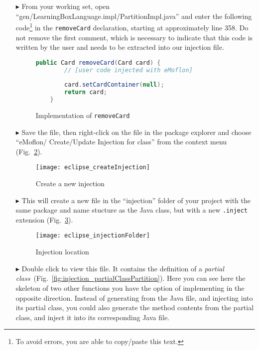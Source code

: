 \begin{itemize}


\item[$\blacktriangleright$] From your working set, open ``gen/LearningBoxLanguage.impl/PartitionImpl.java'' and enter the following code\footnote{To avoid
errors, you are able to copy/paste this text.} in the \texttt{removeCard} declaration, starting at approximately line 358. Do not remove the first comment,
which is necessary to indicate that this code is written by the user and needs to be extracted into our injection file.

\begin{figure}[htbp]
        \centering
        \begin{lstlisting}[language=Java, keywordstyle={\bfseries\color{purple}}, backgroundcolor=\color{white}]
    public Card removeCard(Card card) {
        // [user code injected with eMoflon]
        
        card.setCardContainer(null);
        return card;
    }
        \end{lstlisting}
        \caption{Implementation of \texttt{removeCard}}
        \label{fig:addToStringRep_impl}
\end{figure}

\item[$\blacktriangleright$] Save the file, then right-click on the file in the package explorer and choose ``eMoflon/ Create/Update Injection for class'' from
the context menu (Fig.~\ref{fig:injection_create_injection}).

\begin{figure}[htbp]
    \centering
    \texttt{[image: eclipse\_createInjection]}
    \caption{Create a new injection}
    \label{fig:injection_create_injection}
\end{figure}
    
\item[$\blacktriangleright$] This will create a new file in the ``injection'' folder of your project with the same package and name stucture as the Java class,
but with a new \texttt{.inject} extension (Fig.~\ref{fig:injection_folder}).

\begin{figure}[htbp]
    \centering
    \texttt{[image: eclipse\_injectionFolder]}
    \caption{Injection location}
    \label{fig:injection_folder}
\end{figure}

\item[$\blacktriangleright$] Double click to view this file. It contains the definition of a \textit{partial
class}~(Fig.~\ref{fig:injection_partialClassPartition}). Here you can see here the skeleton of two other functions you have the option of implementing in the
opposite direction. Instead of generating from the Java file, and injecting into its partial class, you could also generate the method contents from the
partial class, and inject it into its corresponding Java file.


\end{itemize}
